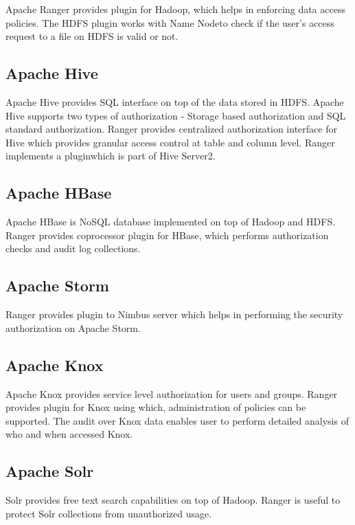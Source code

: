 \documentclass[9pt,twocolumn,twoside]{../../styles/osajnl}
\begin{document}
Apache Ranger provides plugin for Hadoop, which helps in enforcing data access
policies. The HDFS plugin works with Name Node\SE to check if the user's access
request to a file on HDFS is valid or not.




\subsection{Apache Hive}

Apache Hive provides SQL interface on top of the data stored in HDFS. Apache
Hive supports two types of authorization - Storage based authorization and
SQL standard authorization. Ranger provides centralized authorization
interface for Hive which provides granular access control at table and column
 level. Ranger implements a plugin\GE which is part of Hive Server2.


\subsection{Apache HBase}
Apache HBase is NoSQL database implemented on top of Hadoop and HDFS. Ranger
provides coprocessor plugin for HBase, which performs authorization checks and
 audit log collections.

\subsection{Apache Storm}
Ranger provides plugin to Nimbus server which helps in performing the
security authorization on Apache Storm.

\subsection{Apache Knox}
Apache Knox provides service level authorization for users and groups. Ranger
 provides plugin for Knox using which, administration of policies can be
 supported. The audit over Knox data enables user to perform detailed
 analysis of who and when accessed Knox.

\subsection{Apache Solr}
Solr provides free text search capabilities on top of Hadoop. Ranger is
useful to protect Solr collections from unauthorized usage.
\end{document}
